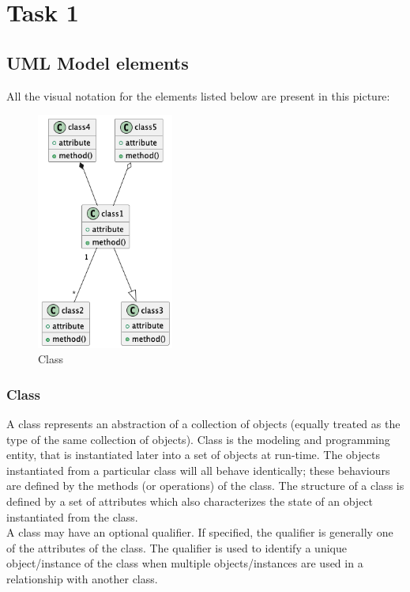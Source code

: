 \chapter{Task 1}
\section{UML Model elements}
All the visual notation for the elements listed below are present in this picture:
\begin{figure}[hbt]
\label{Class}
  \centering\includegraphics[width=0.4\textwidth]{Immagini/test-3.png}
  \caption{Class}
\end{figure}


\subsection{Class}
A class represents an abstraction of a collection of objects (equally treated as the type of the same collection of objects). Class is the modeling and programming entity, that is instantiated later into a set of objects at run-time. The objects instantiated from a particular class will all behave identically; these behaviours are defined by the methods (or operations) of the class. The structure of a class is defined by a set of attributes which also characterizes the state of an object instantiated from the class.\\

A class may have an optional qualifier. If specified, the qualifier is generally one of the attributes of the class. The qualifier is used to identify a unique object/instance of the class when multiple objects/instances are used in a relationship with another class.\\

